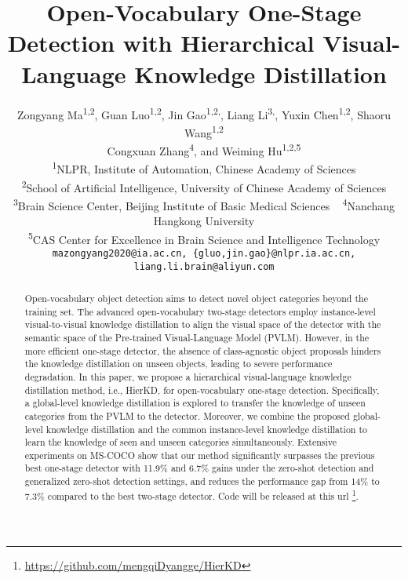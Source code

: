 \documentclass[10pt,twocolumn,letterpaper]{article}
\begin{document}
\title{Open-Vocabulary One-Stage Detection with Hierarchical Visual-Language Knowledge Distillation}

\author{Zongyang Ma\textsuperscript{1,2}, Guan Luo\textsuperscript{1,2}, Jin Gao\textsuperscript{1,2,}, Liang Li\textsuperscript{3,}, Yuxin Chen\textsuperscript{1,2}, Shaoru Wang\textsuperscript{1,2}\\ 
Congxuan Zhang\textsuperscript{4}, and Weiming Hu\textsuperscript{1,2,5}\\
\textsuperscript{1}NLPR, Institute of Automation, Chinese Academy of Sciences\\
\textsuperscript{2}School of Artificial Intelligence, University of Chinese Academy of Sciences\\
\textsuperscript{3}Brain Science Center, Beijing Institute of Basic Medical Sciences ~ \textsuperscript{4}Nanchang Hangkong University\\
\textsuperscript{5}CAS Center for Excellence in Brain Science and Intelligence Technology\\
{\tt\small mazongyang2020@ia.ac.cn, \{gluo,jin.gao\}@nlpr.ia.ac.cn, liang.li.brain@aliyun.com}
}



\maketitle



\begin{abstract}
   Open-vocabulary object detection aims to detect novel object categories beyond the training set. 
   The advanced open-vocabulary two-stage detectors employ instance-level visual-to-visual knowledge distillation to align the visual space of the detector with the semantic space of the Pre-trained Visual-Language Model (PVLM). 
   However, in the more efficient one-stage detector, the absence of class-agnostic object proposals hinders the knowledge distillation on unseen objects, leading to severe performance degradation.
   In this paper, we propose a hierarchical visual-language knowledge distillation method, i.e., HierKD, for open-vocabulary one-stage detection.
Specifically, a global-level knowledge distillation is explored to transfer the knowledge of unseen categories from the PVLM to the detector. 
   Moreover, we combine the proposed global-level knowledge distillation and the common instance-level knowledge distillation to learn the knowledge of seen and unseen categories simultaneously.
Extensive experiments on MS-COCO show that our method significantly surpasses the  previous best one-stage detector with 11.9\% and 6.7\%  gains under the zero-shot detection and generalized zero-shot detection settings, and reduces the  performance gap from 14\% to 7.3\% compared to the best two-stage detector. 
   Code will be released at this url \footnote{\url{ https://github.com/mengqiDyangge/HierKD}}.




\end{abstract}
\end{document}

